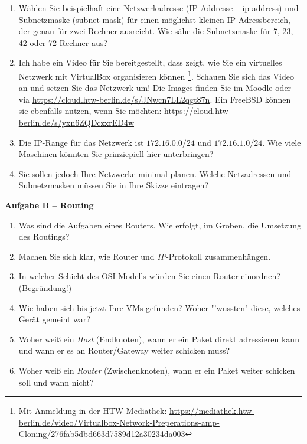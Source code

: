 \documentclass[paper=a4,fontsize=11pt]{scrartcl}%
\numberwithin{equation}{section}
\begin{document}
\begin{enumerate}
\begin{enumerate}
		\item Wählen Sie beispielhaft eine Netzwerkadresse (IP-Addresse -- ip address) und Subnetzmaske (subnet mask) für einen möglichst kleinen IP-Adressbereich, der genau für zwei Rechner ausreicht. Wie sähe die Subnetzmaske für 7, 23, 42 oder 72 Rechner aus? 
		\item Ich habe ein Video für Sie bereitgestellt, dass zeigt, wie Sie ein virtuelles Netzwerk mit VirtualBox organisieren können \footnote{Mit Anmeldung in der HTW-Mediathek: \url{https://mediathek.htw-berlin.de/video/Virtualbox-Network-Preperations-amp-Cloning/276fab5dbd663d7589d12a30234da003}}. Schauen Sie sich das Video an und setzen Sie das Netzwerk um! Die Images finden Sie im Moodle oder via \url{https://cloud.htw-berlin.de/s/JNwcn7LL2qgt87n}. Ein FreeBSD können sie ebenfalls nutzen, wenn Sie möchten: \url{https://cloud.htw-berlin.de/s/yxn6ZQDczxrED4w}
		\item Die IP-Range für das Netzwerk ist $172.16.0.0/24$ und $172.16.1.0/24$. Wie viele Maschinen könnten Sie prinziepiell hier unterbringen? 
		\item Sie sollen jedoch Ihre Netzwerke minimal planen. Welche Netzadressen und Subnetzmasken müssen Sie in Ihre Skizze eintragen?
	\end{enumerate}
\end{enumerate}

\begin{center}\Large{\textbf{Aufgabe B -- Routing}}\end{center}

\begin{enumerate}
	\item Was sind die Aufgaben eines Routers. Wie erfolgt, im Groben, die Umsetzung des Routings?
	\item Machen Sie sich klar, wie Router und \emph{IP}-Protokoll zusammenhängen.
	\item In welcher Schicht des OSI-Modells würden Sie einen Router einordnen? (Begründung!)
	\item Wie haben sich bis jetzt Ihre VMs gefunden? Woher "'wussten" diese, welches Gerät gemeint war?
	\item Woher weiß ein \textit{Host} (Endknoten), wann er ein Paket direkt adressieren kann und wann er es an Router/Gateway weiter schicken muss?
	\item Woher weiß ein \textit{Router} (Zwischenknoten), wann er ein Paket weiter schicken soll und wann nicht?
\end{enumerate}
\end{document}
